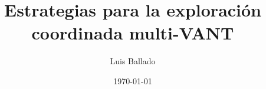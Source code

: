 \documentclass[
	11pt, %
]{beamer}
\title[SEMINARIO DE INVESTIGACIÓN I]{Estrategias para la exploración coordinada multi-VANT} %
\author[Luis Ballado]{Luis Ballado} %
\institute[CINVESTAV]{CINVESTAV - UNIDAD TAMAULIPAS \\ \smallskip \textit{luis.ballado@cinvestav.mx}} %
\date[\today]{\today} %
\begin{document}

\begin{frame}
	\titlepage %
\end{frame}



	


\end{document}
